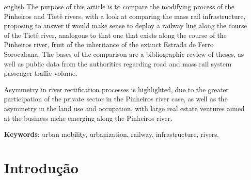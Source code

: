 \documentclass[
article,			%
11pt,				%
oneside,			%
a4paper,			%
english,			%
brazil,				%
sumario=tradicional
]{abntex2}
\begin{document}
	
	\emptythanks
	\maketitle
	
	\renewcommand{\resumoname}{Abstract}
	\begin{resumoumacoluna}
		\begin{otherlanguage*}{english}
			The purpose of this article is to compare the modifying process of the Pinheiros and Tietê rivers, with a look at comparing the mass rail infrastructure, proposing to answer if would make sense to deploy a railway line along the course of the Tietê river, analogous to that one that exists along the course of the Pinheiros river, fruit of the inheritance of the extinct Estrada de Ferro Sorocabana. The bases of the comparison are a bibliographic review of theses, as well as public data from the authorities regarding road and mass rail system passenger traffic volume.
			
			Asymmetry in river rectification processes is highlighted, due to the greater participation of the private sector in the Pinheiros river case, as well as the asymmetry in the land use and occupation, with large real estate ventures aimed at the business niche emerging along the Pinheiros river.
			
			\vspace{\onelineskip}
			
			\noindent
			\textbf{Keywords}: urban mobility, urbanization, railway, infrastructure, rivers.
		\end{otherlanguage*}
	\end{resumoumacoluna}
	
	
	\textual
	
	\section*{Introdução}
	
\end{document}
